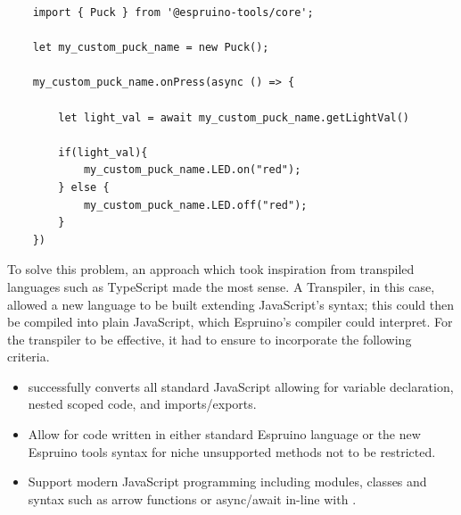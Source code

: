 \documentclass{l4proj}
\begin{document}
\begin{lstlisting}
    import { Puck } from '@espruino-tools/core';

    let my_custom_puck_name = new Puck();
    
    my_custom_puck_name.onPress(async () => {
    
        let light_val = await my_custom_puck_name.getLightVal()
        
        if(light_val){
            my_custom_puck_name.LED.on("red");
        } else {
            my_custom_puck_name.LED.off("red");
        }
    })
\end{lstlisting}

To solve this problem, an approach which took inspiration from transpiled languages such as TypeScript made the most sense. A Transpiler, in this case, allowed a new language to be built extending JavaScript's syntax; this could then be compiled into plain JavaScript, which Espruino's compiler could interpret. For the transpiler to be effective, it had to ensure to incorporate the following criteria.
\\
\begin{itemize}
    \item successfully converts all standard JavaScript allowing for variable declaration, nested scoped code, and imports/exports.
    \item Allow for code written in either standard Espruino language or the new Espruino tools syntax for niche unsupported methods not to be restricted.
    \item Support modern JavaScript programming including modules, classes and syntax such as arrow functions or async/await in-line with \cite{kolce2018javascript}.
\end{itemize}
\end{document}
